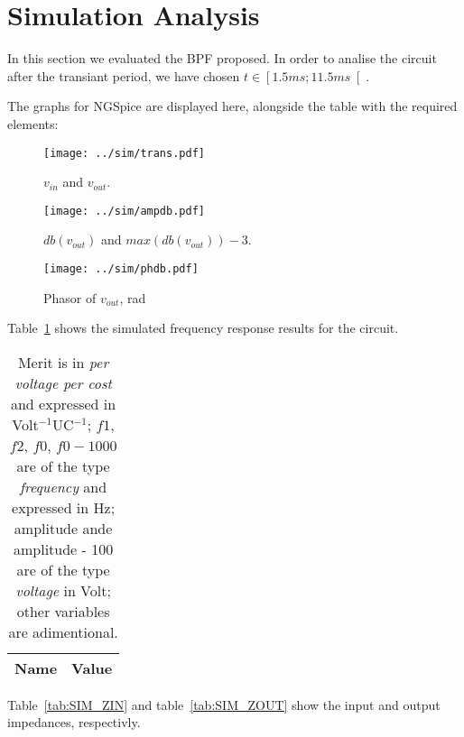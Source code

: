 \section{Simulation Analysis }
\label{sec:simulation}

In this section we evaluated the BPF proposed.
In order to analise the circuit after the transiant period, we have chosen $t \in \left[ 1.5 ms; 11.5 ms \right[ $.

The graphs for NGSpice are displayed here, alongside the table with the required elements:

\begin{figure}[h] 
	\centering
	\vspace{-3cm}
	\texttt{[image: ../sim/trans.pdf]}
	\vspace{-0.75cm}
	\caption{$v_{in}$ and $v_{out}$.}
	\label{fig:SIM_TRANS}
\end{figure}

\begin{figure}[h] \centering
	\vspace{-3cm}
	\texttt{[image: ../sim/ampdb.pdf]}
	\vspace{-0.75cm}
	\caption{$db(v_{out})$ and $max(db(v_{out}))-3$.}
	\label{fig:SIM_OUT}
\end{figure}

\begin{figure}[h] \centering
	\vspace{-3cm}
	\texttt{[image: ../sim/phdb.pdf]}
	\vspace{-0.75cm}
	\caption{Phasor of $v_{out}$, rad}
	\label{fig:SIM_PH}
\end{figure}

\newpage

Table~\ref{tab:SIM_RES} shows the simulated frequency response results for the circuit.
\begin{table}[h]
  \centering
  \begin{tabular}{|l|r|}
    \hline    
    {\bf Name} & {\bf Value} \\ \hline
    
  \end{tabular}
  \caption{Merit is in {\it per voltage per cost} and expressed in Volt$^{-1}$UC$^{-1}$; $f1$, $f2$,  $f0$, $f0-1000$ are of the type {\it frequency} and expressed in Hz; amplitude ande amplitude - 100 are of the type {\it voltage} in Volt; other variables are adimentional.}
  \label{tab:SIM_RES}
\end{table}

\newpage
Table~\ref{tab:SIM_ZIN} and table~\ref{tab:SIM_ZOUT} show the input and output impedances, respectivly.

